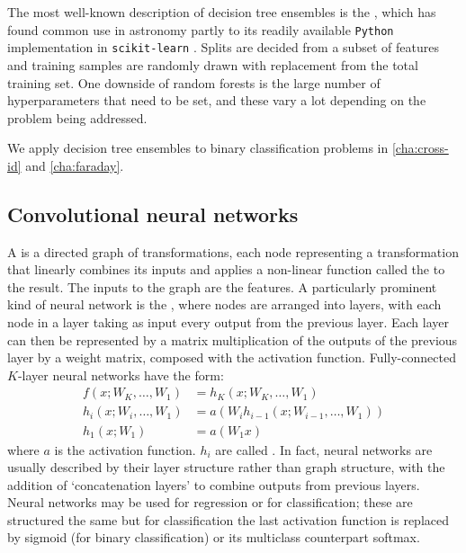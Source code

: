         The most well-known description of decision tree ensembles is the  \citep{breiman01random-forest}, which has found common use in astronomy partly to its readily available \texttt{Python} implementation in \texttt{scikit-learn} \citep{scikit-learn}. Splits are decided from a subset of features and training samples are randomly drawn with replacement from the total training set. One downside of random forests is the large number of hyperparameters that need to be set, and these vary a lot depending on the problem being addressed.

        We apply decision tree ensembles to binary classification problems in \autoref{cha:cross-id} and \autoref{cha:faraday}.

    \subsection{Convolutional neural networks}
    \label{sec:cnns}

        A  is a directed graph of transformations, each node representing a transformation that linearly combines its inputs and applies a non-linear function called the  to the result. The inputs to the graph are the features. A particularly prominent kind of neural network is the , where nodes are arranged into layers, with each node in a layer taking as input every output from the previous layer. Each layer can then be represented by a matrix multiplication of the outputs of the previous layer by a weight matrix, composed with the activation function. Fully-connected $K$-layer neural networks have the form:
        \begin{align}
            f(x; W_K, \dots, W_1) &= h_K(x; W_K, \dots, W_1)\\
            h_i(x; W_i, \dots, W_1) &= a(W_i h_{i - 1}(x; W_{i - 1}, \dots, W_1))\label{eq:hidden-layer}\\
            h_1(x; W_1) &= a(W_1 x)
        \end{align}
        where $a$ is the activation function. $h_i$ are called . In fact, neural networks are usually described by their layer structure rather than graph structure, with the addition of `concatenation layers' to combine outputs from previous layers. Neural networks may be used for regression or for classification; these are structured the same but for classification the last activation function is replaced by sigmoid (for binary classification) or its multiclass counterpart softmax.

